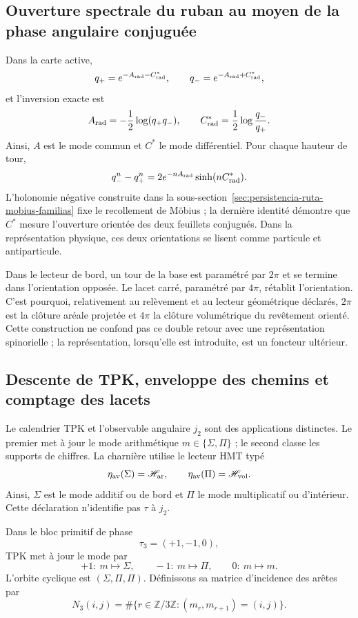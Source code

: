 \subsection{Ouverture spectrale du ruban au moyen de la phase angulaire conjuguée}

Dans la carte active,
\[
 q_+=e^{-A_{\rm rad}-C^*_{\rm rad}},\qquad
 q_-=e^{-A_{\rm rad}+C^*_{\rm rad}},
\]
et l'inversion exacte est
\[
 A_{\rm rad}=-\frac12\log(q_+q_-),
 \qquad
 C^*_{\rm rad}=\frac12\log\frac{q_-}{q_+}.
\]
Ainsi, \(A\) est le mode commun et \(C^*\) le mode différentiel. Pour chaque
hauteur de tour,
\[
 q_-^n-q_+^n
 =2e^{-nA_{\rm rad}}\sinh(nC^*_{\rm rad}).
\]
L'holonomie négative construite dans la
sous-section~\ref{sec:persistencia-ruta-mobius-familias} fixe le recollement
de Möbius ; la dernière identité démontre que \(C^*\) mesure l'ouverture
orientée des deux feuillets conjugués. Dans la représentation physique, ces deux
orientations se lisent comme particule et antiparticule.

Dans le lecteur de bord, un tour de la base est paramétré par \(2\pi\) et
se termine dans l'orientation opposée. Le lacet carré, paramétré par
\(4\pi\), rétablit l'orientation. C'est pourquoi, relativement au relèvement et au
lecteur géométrique déclarés, \(2\pi\) est la clôture aréale projetée et
\(4\pi\) la clôture volumétrique du revêtement orienté. Cette construction ne
confond pas ce double retour avec une représentation spinorielle ; la
représentation, lorsqu'elle est introduite, est un foncteur ultérieur.

\subsection{Descente de TPK, enveloppe des chemins et comptage des lacets}

Le calendrier TPK et l'observable angulaire \(j_2\) sont des applications distinctes. Le
premier met à jour le mode arithmétique
\(m\in\{\Sigma,\Pi\}\) ; le second classe les supports de chiffres. La
charnière utilise le lecteur HMT typé
\[
 \eta_{\rm av}(\Sigma)=\mathscr H_{\rm ar},
 \qquad
 \eta_{\rm av}(\Pi)=\mathscr H_{\rm vol}.
\]
Ainsi, \(\Sigma\) est le mode additif ou de bord et \(\Pi\) le mode
multiplicatif ou d'intérieur. Cette déclaration n'identifie pas
\(\tau\) à \(j_2\).

Dans le bloc primitif de phase
\[
 \tau_3=(+1,-1,0),
\]
TPK met à jour le mode par
\[
 +1:\ m\mapsto\Sigma,\qquad
 -1:\ m\mapsto\Pi,\qquad
 0:\ m\mapsto m.
\]
L'orbite cyclique est \((\Sigma,\Pi,\Pi)\). Définissons sa matrice
d'incidence des arêtes par
\[
 N_3(i,j)=
 \#\{r\in\mathbb Z/3\mathbb Z:(m_r,m_{r+1})=(i,j)\}.
\]

